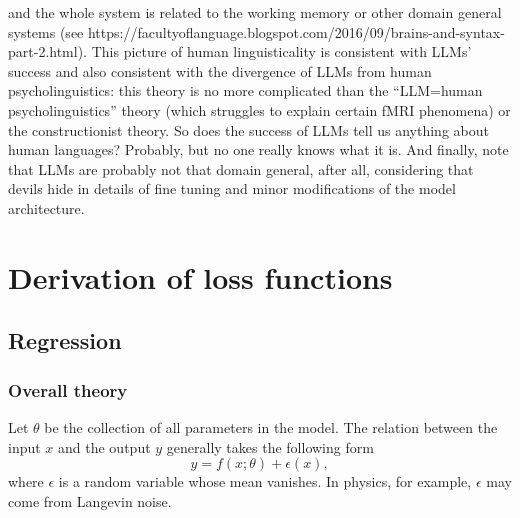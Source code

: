 \documentclass[hyperref, a4paper, 12pt]{report}
\begin{document}
and the whole system is related to the working memory or other domain general systems (see https://facultyoflanguage.blogspot.com/2016/09/brains-and-syntax-part-2.html).
This picture of human linguisticality is consistent with LLMs' success
and also consistent with the divergence of LLMs from human psycholinguistics:
this theory is no more complicated than the ``LLM=human psycholinguistics'' theory (which struggles to explain certain fMRI phenomena) or the constructionist theory.
So does the success of LLMs tell us anything about human languages?
Probably, but no one really knows what it is.
And finally, note that LLMs are probably not that domain general, after all,
considering that devils hide in details of fine tuning and minor modifications of the model architecture.

\chapter{Derivation of loss functions}

\section{Regression}

\subsection{Overall theory}

Let $\theta$ be the collection of all parameters in the model.
The relation between the input $x$ and the output $y$ generally takes the following form
\begin{equation}
    y = f(x; \theta) + \epsilon(x),
\end{equation}
where $\epsilon$ is a random variable whose mean vanishes.
In physics, for example, $\epsilon$ may come from Langevin noise.
\end{document}
